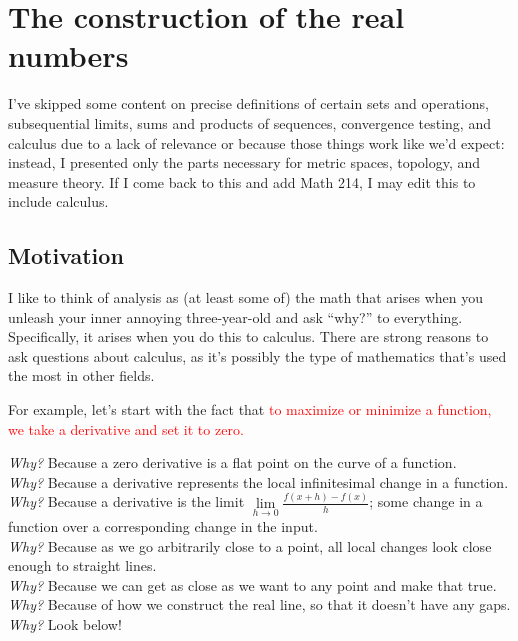 \documentclass[./analysis.tex]{subfiles}
\begin{document}
    \section{The construction of the real numbers}

    I've skipped some content on precise definitions of certain sets and operations, subsequential limits, sums and products of sequences, convergence testing, and calculus due to a lack of relevance or because those things work like we'd expect: instead, I presented only the parts necessary for metric spaces, topology, and measure theory. If I come back to this and add Math 214, I may edit this to include calculus.

    \subsection{Motivation}

    I like to think of analysis as (at least some of) the math that arises when you unleash your inner annoying three-year-old and ask ``why?'' to everything. Specifically, it arises when you do this to calculus. There are strong reasons to ask questions about calculus, as it's possibly the type of mathematics that's used the most in other fields.%

    For example, let's start with the fact that \textcolor{red}{to maximize or minimize a function, we take a derivative and set it to zero.}

    \noindent\emph{Why?} Because a zero derivative is a flat point on the curve of a function.\\
    \emph{Why?} Because a derivative represents the local infinitesimal change in a function.\\
    \emph{Why?} Because a derivative is the limit $\lim\limits_{h \to 0} \frac{f(x + h) - f(x)}{h}$; some change in a function over a corresponding change in the input.\\
    \emph{Why?} Because as we go arbitrarily close to a point, all local changes look close enough to straight lines.\\
    \emph{Why?} Because we can get as close as we want to any point and make that true.\\
    \emph{Why?} Because of how we construct the real line, so that it doesn't have any gaps.\\
    \emph{Why?} Look below!
\end{document}
